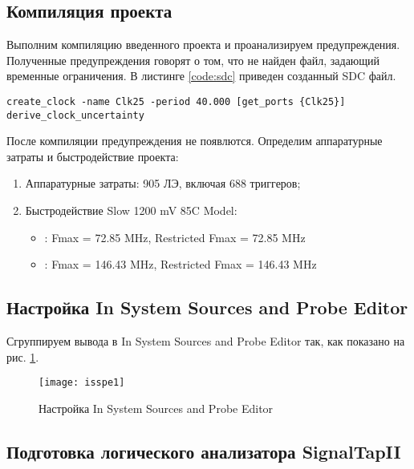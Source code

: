 \subsection{Компиляция проекта}

Выполним компиляцию введенного проекта и проанализируем предупреждения. Полученные предупреждения говорят о том, что не найден файл, задающий временные ограничения. В листинге \ref{code:sdc} приведен созданный SDC файл.

\begin{lstlisting}[caption=Synopsys Design Constraints (SDC) файл, label=code:sdc]
create_clock -name Clk25 -period 40.000 [get_ports {Clk25}]
derive_clock_uncertainty
\end{lstlisting}

После компиляции предупреждения не появлются. Определим аппаратурные затраты и быстродействие проекта:

\begin{enumerate}
	\item Аппаратурные затраты: 905 ЛЭ, включая 688 триггеров;
	\item Быстродействие Slow 1200 mV 85C Model:
		\begin{itemize}[leftmargin=*]
			\item {}: Fmax = 72.85 MHz, Restricted Fmax = 72.85 MHz
			\item {}: Fmax = 146.43 MHz, Restricted Fmax = 146.43 MHz
		\end{itemize}
\end{enumerate}

\subsection{Настройка In System Sources and Probe Editor}

Сгруппируем вывода в In System Sources and Probe Editor так, как показано на рис. \ref{fig:isspe1}.

\vspace{-0.5cm}
\begin{figure}[H]
	\begin{center}
		\texttt{[image: isspe1]}
		\caption{Настройка In System Sources and Probe Editor}
		\label{fig:isspe1}
	\end{center}
\end{figure}
\vspace{-0.5cm}

\subsection{Подготовка логического анализатора SignalTapII}

